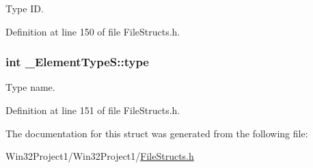 Type ID. 



Definition at line 150 of file File\+Structs.\+h.

\subsubsection[{\texorpdfstring{type}{type}}]{\setlength{\rightskip}{0pt plus 5cm}int \+\_\+\+Element\+Type\+S\+::type}\hypertarget{struct___element_type_s_a9da836c0ca286be959134763e79c9d71}{}\label{struct___element_type_s_a9da836c0ca286be959134763e79c9d71}


Type name. 



Definition at line 151 of file File\+Structs.\+h.



The documentation for this struct was generated from the following file\+:\begin{DoxyCompactItemize}
\item 
Win32\+Project1/\+Win32\+Project1/\hyperlink{_file_structs_8h}{File\+Structs.\+h}\end{DoxyCompactItemize}

